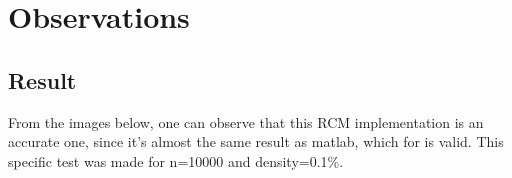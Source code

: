\documentclass[letterpaper,12pt]{article}
\begin{document}
\section{Observations}
\vspace{2mm} %

\subsection{Result}
\vspace{2mm} %

From the images below, one can observe that this RCM implementation is an accurate one, since it's almost the same result as matlab, which for is valid. This specific test was made for n=10000 and density=0.1\%.

\begin{figure}[!htb]


\end{figure}
\end{document}
